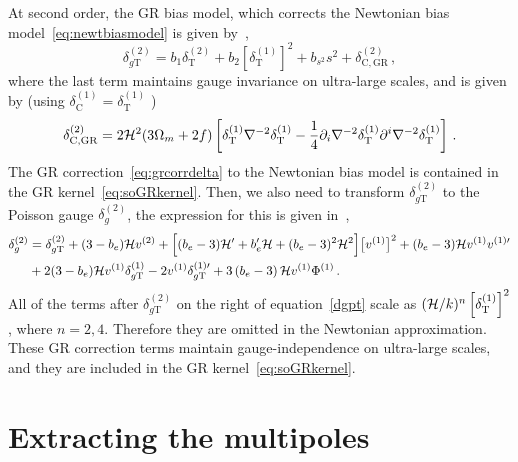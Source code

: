 At second order, the GR bias model, which corrects the Newtonian bias model~\eqref{eq:newtbiasmodel} is given by~\cite{Umeh:2019qyd},
\begin{equation}
	\delta_{g\mathrm{T}}^{(2)} = b_1 \delta_\mathrm{T}^{(2)} + b_2 \left[ \delta_\mathrm{T}^{(1)} \right]^2 + b_{s^2} s^2 + \delta_{\mathrm{C,GR}}^{(2)}\,,
\end{equation}
where the last term maintains gauge invariance on ultra-large scales, and is given by (using \( \delta_\mathrm{C}^{(1)} =  \delta_\mathrm{T}^{(1)}\) )
\begin{equation}\label{eq:grcorrdelta}
	\delta_{\mathrm{C,GR}}^{(2)} = 2 \mathcal{H}^2 (3 \Omega_m + 2 f) \left[ \delta_\mathrm{T}^{(1)} \nabla^{-2} \delta_\mathrm{T}^{(1)} - \frac{1}{4} \partial_i \nabla^{-2} \delta_\mathrm{T}^{(1)} \partial^i \nabla^{-2} \delta_\mathrm{T}^{(1)} \right]\,.
\end{equation}
The GR correction~\eqref{eq:grcorrdelta} to the Newtonian bias model is contained in the GR kernel~\eqref{eq:soGRkernel}. Then, we also need to transform \(\delta_{g\mathrm{T}}^{(2)}\) to the Poisson	 gauge \( \delta_g^{(2)} \), the expression for this is given in~\cite{Jolicoeur:2017nyt}, 
\begin{align}
\delta_{g}^{(2)}  &= \delta_{g{\mathrm{T}} }^{(2)} + (3-b_e) \mathcal{H} v^{(2)} +\Big[ (b_e-3) \mathcal{H}' + b_e' \mathcal{H} + (b_e-3)^2 \mathcal{H}^2 \Big]  \big[v^{(1)}\big]^2 + (b_e-3)\mathcal{H}   v^{(1)}  v^{(1)\prime} \nonumber\\
& +2(3-b_e)\mathcal{H}  v^{(1)} \delta_{g{\mathrm{T}}}^{(1)}  - 2  v^{(1)} \delta_{g{\mathrm{T}}}^{(1)\prime} + 3 \left( b_e-3\right) \mathcal{H} v^{(1)}\Phi^{(1)} \,.\label{dgpt}
\end{align}
All of the terms after $\delta_{g\mathrm{T}}^{(2)}$ on the right of equation~\eqref{dgpt} scale as $(\mathcal{H}/k)^n \left[ \delta^{(1)}_\mathrm{T} \right]^2$, where $n = 2,4$. Therefore they are omitted in the Newtonian approximation. These GR correction terms maintain gauge-independence on ultra-large scales, and they are included in the GR kernel~\eqref{eq:soGRkernel}.


\section{Extracting the multipoles}\label{sec:extrmulti}

